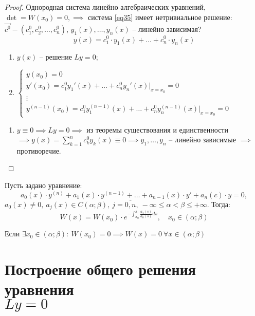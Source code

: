 \begin{proof}
    Однородная система линейно алгебраических уравнений, $\det = W(x_0) = 0, \implies$ система \ref{eq35} имеет нетривиальное решение: $\overrightarrow{c^0} - (c_1^0,c_2^0,\ldots,c_n^0)$, $y_1(x),\ldots,y_n(x)$ -- линейно зависимая?
    \[
        y(x) = c_1^0 \cdot y_1(x) + \ldots + c_n^0 \cdot y_n(x)
    \]
    \begin{enumerate}
        \item $y(x)$ -- решение $Ly = 0$;
        \item $\left\{\begin{array}{l}
                      y(x_0) = 0                                                        \\
                      y'(x_0) = c_1^0 y_1'(x) + \ldots + c_n^0y_n'(x)\bigg|_{x=x_0} = 0 \\
                      \vdots                                                            \\
                      y^{(n-1)}(x_0) = c_1^0 y_1^{(n-1)}(x) + \ldots + c_n^0y_n^{(n-1)}(x)\bigg|_{x=x_0} = 0
                  \end{array}\right.$
    \end{enumerate}
    \begin{enumerate}
        \item $y\equiv0 \implies Ly = 0 \implies$ из теоремы существования и единственности $\implies y(x) = \sum_{k=1}^{n}c_k^0 y_k(x) \equiv 0 \implies y_1,\ldots,y_n$ -- линейно зависимые $\implies$ противоречие.
    \end{enumerate}
\end{proof}

\begin{theorem}
    Пусть задано уравнение:
    \[
        a_0(x)\cdot y^{(n)} + a_1(x)\cdot y^{(n-1)} + \ldots + a_{n-1}(x)\cdot y' + a_n(c)\cdot y = 0,
    \]
    $a_0(x) \ne 0, \ a_j(x)\in C(\alpha;\beta), \ j = \overline{0,n}, \ -\infty\leqslant\alpha<\beta\leqslant+\infty$. Тогда:
    \[
        W(x) = W(x_0) \cdot e^{-\int_{x_0}^{x}\frac{a_1(s)}{a_0(s)}ds}, \quad x_0 \in (\alpha;\beta)
    \]
\end{theorem}

\begin{corollary}
    Если $\exists x_0 \in (\alpha;\beta): \ W(x_0) = 0 \implies W(x) = 0 \ \forall x \in (\alpha;\beta)$
\end{corollary}

\section{Построение общего решения уравнения \\ $Ly = 0$}

